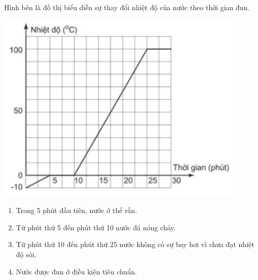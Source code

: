 \begin{ex}
Hình bên là đồ thị biểu diễn sự thay đổi nhiệt độ của nước theo thời gian đun.
\begin{center}
	\includegraphics[width=0.45\linewidth]{figs/VN12-Y24-PH-SYL-001P-4}
\end{center}
\begin{enumerate}[label=\alph*)]
	\item Trong 5 phút đầu tiên, nước ở thể rắn.
	\item Từ phút thứ 5 đến phút thứ 10 nước đá nóng chảy.
	\item Từ phút thứ 10 đến phút thứ 25 nước không có sự bay hơi vì chưa đạt nhiệt độ sôi.
	\item Nước được đun ở điều kiện tiêu chuẩn.
\end{enumerate}
\end{ex}

